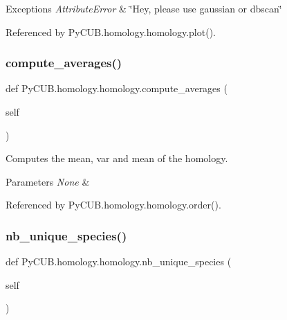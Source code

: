 \begin{DoxyExceptions}{Exceptions}
{\em Attribute\+Error} & \char`\"{}\+Hey, please use gaussian or dbscan\char`\"{} \\
\hline
\end{DoxyExceptions}


Referenced by Py\+C\+U\+B.\+homology.\+homology.\+plot().

\mbox{\label{class_py_c_u_b_1_1homology_1_1homology_aaeb164cd217a4746ff0082da1a92fc5e}} 
\subsubsection{\texorpdfstring{compute\+\_\+averages()}{compute\_averages()}}
{\footnotesize\ttfamily def Py\+C\+U\+B.\+homology.\+homology.\+compute\+\_\+averages (\begin{DoxyParamCaption}\item[{}]{self }\end{DoxyParamCaption})}



Computes the mean, var and mean of the homology. 


\begin{DoxyParams}{Parameters}
{\em None} & \\
\hline
\end{DoxyParams}


Referenced by Py\+C\+U\+B.\+homology.\+homology.\+order().

\mbox{\label{class_py_c_u_b_1_1homology_1_1homology_ad430899a462da76cdd6e1fc6ee73e0ec}} 
\subsubsection{\texorpdfstring{nb\+\_\+unique\+\_\+species()}{nb\_unique\_species()}}
{\footnotesize\ttfamily def Py\+C\+U\+B.\+homology.\+homology.\+nb\+\_\+unique\+\_\+species (\begin{DoxyParamCaption}\item[{}]{self }\end{DoxyParamCaption})}



